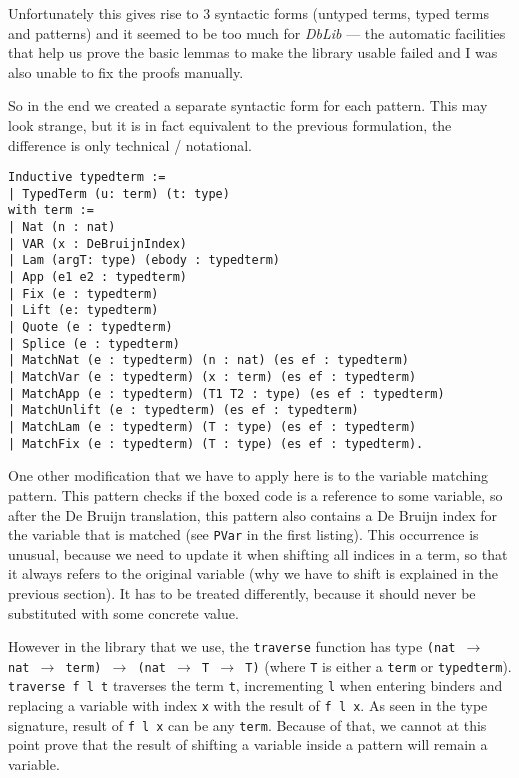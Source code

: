 \documentclass[runningheads]{article}
\begin{document}
Unfortunately this gives rise to 3 syntactic forms (untyped terms, typed terms and patterns) and it seemed to be too much for \textit{DbLib} --- the automatic facilities that help us prove the basic lemmas to make the library usable failed and I was also unable to fix the proofs manually.

So in the end we created a separate syntactic form for each pattern. This may look strange, but it is in fact equivalent to the previous formulation, the difference is only technical / notational.

\begin{verbatim}
Inductive typedterm :=
| TypedTerm (u: term) (t: type)
with term :=
| Nat (n : nat)
| VAR (x : DeBruijnIndex)
| Lam (argT: type) (ebody : typedterm)
| App (e1 e2 : typedterm)
| Fix (e : typedterm)
| Lift (e: typedterm)
| Quote (e : typedterm)
| Splice (e : typedterm)
| MatchNat (e : typedterm) (n : nat) (es ef : typedterm)
| MatchVar (e : typedterm) (x : term) (es ef : typedterm)
| MatchApp (e : typedterm) (T1 T2 : type) (es ef : typedterm)
| MatchUnlift (e : typedterm) (es ef : typedterm)
| MatchLam (e : typedterm) (T : type) (es ef : typedterm)
| MatchFix (e : typedterm) (T : type) (es ef : typedterm).
\end{verbatim}

One other modification that we have to apply here is to the variable matching pattern. This pattern checks if the boxed code is a reference to some variable, so after the De Bruijn translation, this pattern also contains a De Bruijn index for the variable that is matched (see \texttt{PVar} in the first listing). This occurrence is unusual, because we need to update it when shifting all indices in a term, so that it always refers to the original variable (why we have to shift is explained in the previous section). It has to be treated differently, because it should never be substituted with some concrete value.

However in the library that we use, the \texttt{traverse} function has type \texttt{(nat $\to$ nat $\to$ term) $\to$ (nat $\to$ T $\to$ T)} (where \texttt{T} is either a \texttt{term} or \texttt{typedterm}). \texttt{traverse f l t} traverses the term \texttt{t}, incrementing \texttt{l} when entering binders and replacing a variable with index \texttt{x} with the result of \texttt{f l x}. As seen in the type signature, result of \texttt{f l x} can be any \texttt{term}. Because of that, we cannot at this point prove that the result of shifting a variable inside a pattern will remain a variable.
\end{document}
